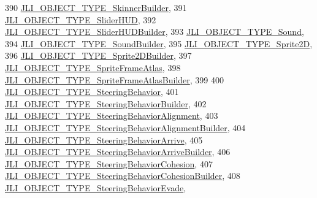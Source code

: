 \begin{DoxyCode}
390     \mbox{\hyperlink{namespacenjli_a6d56d4fbaf89fcf3e3d32839df05b444a8de53302fea09b281262471e64b67820}{JLI\_OBJECT\_TYPE\_SkinnerBuilder}},
391     \mbox{\hyperlink{namespacenjli_a6d56d4fbaf89fcf3e3d32839df05b444af64e688481302082f6f47dbc35a3fe76}{JLI\_OBJECT\_TYPE\_SliderHUD}},
392     \mbox{\hyperlink{namespacenjli_a6d56d4fbaf89fcf3e3d32839df05b444ace531648ee82cafd2a91ffcf493f9bc9}{JLI\_OBJECT\_TYPE\_SliderHUDBuilder}},
393     \mbox{\hyperlink{namespacenjli_a6d56d4fbaf89fcf3e3d32839df05b444afa72f4ef2201548791e65b9b29144b43}{JLI\_OBJECT\_TYPE\_Sound}},
394     \mbox{\hyperlink{namespacenjli_a6d56d4fbaf89fcf3e3d32839df05b444ae872062926d4d51fc2625741619ab25b}{JLI\_OBJECT\_TYPE\_SoundBuilder}},
395     \mbox{\hyperlink{namespacenjli_a6d56d4fbaf89fcf3e3d32839df05b444a1c45612513be6377931cb97d659ec8d7}{JLI\_OBJECT\_TYPE\_Sprite2D}},
396     \mbox{\hyperlink{namespacenjli_a6d56d4fbaf89fcf3e3d32839df05b444ab2651c8d5f919ce0a7056a3549f070c4}{JLI\_OBJECT\_TYPE\_Sprite2DBuilder}},
397     \mbox{\hyperlink{namespacenjli_a6d56d4fbaf89fcf3e3d32839df05b444a0a15fb116280a1dfea4e3b214df1a48e}{JLI\_OBJECT\_TYPE\_SpriteFrameAtlas}},
398     \mbox{\hyperlink{namespacenjli_a6d56d4fbaf89fcf3e3d32839df05b444a70ca4c5b691e286c318b68ff54457f55}{JLI\_OBJECT\_TYPE\_SpriteFrameAtlasBuilder}},
399 
400     \mbox{\hyperlink{namespacenjli_a6d56d4fbaf89fcf3e3d32839df05b444afb988c15c8acfa41ed67870d385f92d0}{JLI\_OBJECT\_TYPE\_SteeringBehavior}},
401     \mbox{\hyperlink{namespacenjli_a6d56d4fbaf89fcf3e3d32839df05b444adc585b2deaac7f48656b5979d77d88c5}{JLI\_OBJECT\_TYPE\_SteeringBehaviorBuilder}},
402     \mbox{\hyperlink{namespacenjli_a6d56d4fbaf89fcf3e3d32839df05b444af6d51f3796c8cf559ba2eb1f5fd9ef91}{JLI\_OBJECT\_TYPE\_SteeringBehaviorAlignment}},
403     \mbox{\hyperlink{namespacenjli_a6d56d4fbaf89fcf3e3d32839df05b444afddfa8e2cdb983f1df414fc562eda404}{JLI\_OBJECT\_TYPE\_SteeringBehaviorAlignmentBuilder}},
404     \mbox{\hyperlink{namespacenjli_a6d56d4fbaf89fcf3e3d32839df05b444acd54ff18795b7270f44dfa963f2955ae}{JLI\_OBJECT\_TYPE\_SteeringBehaviorArrive}},
405     \mbox{\hyperlink{namespacenjli_a6d56d4fbaf89fcf3e3d32839df05b444a5fba043af3f36aabdae637978dc08cac}{JLI\_OBJECT\_TYPE\_SteeringBehaviorArriveBuilder}},
406     \mbox{\hyperlink{namespacenjli_a6d56d4fbaf89fcf3e3d32839df05b444a6298862ed617f9410c0bfe57b76dce5d}{JLI\_OBJECT\_TYPE\_SteeringBehaviorCohesion}},
407     \mbox{\hyperlink{namespacenjli_a6d56d4fbaf89fcf3e3d32839df05b444a9ba2a788fe8f0fcbe22e372e58fb3e6d}{JLI\_OBJECT\_TYPE\_SteeringBehaviorCohesionBuilder}},
408     \mbox{\hyperlink{namespacenjli_a6d56d4fbaf89fcf3e3d32839df05b444a4afde8f4cb4c4089bb47a4824fdfdd16}{JLI\_OBJECT\_TYPE\_SteeringBehaviorEvade}},

\end{DoxyCode}
